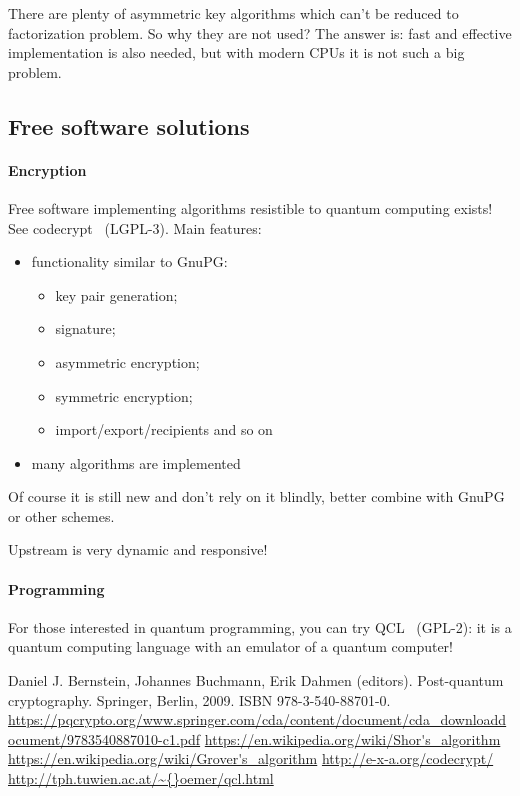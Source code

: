 \documentclass[10pt, a5paper]{article}
\begin{document}
There are plenty of asymmetric key algorithms which can't be \linebreak reduced to factorization problem. So why they are not used? The answer is: fast and effective implementation is also needed, but with modern CPUs it is not such a big problem.

\subsection*{Free software solutions}

\paragraph{Encryption}

Free software implementing algorithms resistible to \linebreak quantum computing exists! See codecrypt~\cite{Savchenko4} (LGPL-3). Main features:

\begin{itemize}
  \item functionality similar to GnuPG:\begin{itemize}
  \item key pair generation;
  \item signature;
  \item asymmetric encryption;
  \item symmetric encryption;
  \item import/export/recipients and so on
\end{itemize}


  \item many algorithms are implemented
\end{itemize}

Of course it is still new and don't rely on it blindly, better combine with GnuPG or other schemes.

Upstream is very dynamic and responsive!

\paragraph{Programming}

For those interested in quantum programming, you can try QCL~\cite{Savchenko5} (GPL-2): it is a quantum computing language with an emulator of a quantum computer!

\begin{thebibliography}{99}
Daniel J. Bernstein, Johannes Buchmann, Erik Dahmen (editors). Post-quantum cryptography. Springer, Berlin, 2009. ISBN 978-3-540-88701-0. \url{https://pqcrypto.org/www.springer.com/cda/content/document/cda\_downloaddocument/9783540887010-c1.pdf}
\url{https://en.wikipedia.org/wiki/Shor's\_algorithm}
\url{https://en.wikipedia.org/wiki/Grover's\_algorithm}
\url{http://e-x-a.org/codecrypt/}
\url{http://tph.tuwien.ac.at/\~{}oemer/qcl.html}
\end{thebibliography}
\end{document}
